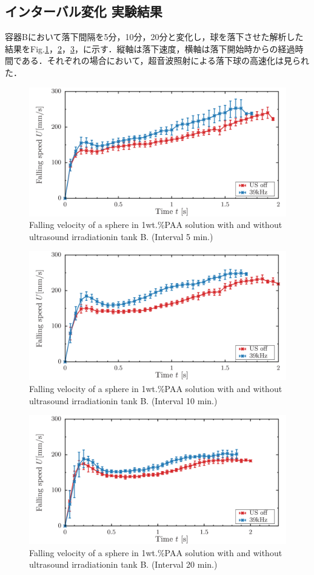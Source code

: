 \newpage

\subsection{インターバル変化 実験結果}

容器Bにおいて落下間隔を5分，10分，20分と変化し，球を落下させた解析した結果をFig.\ref{fig:falling-5}，\ref{fig:falling-10}，\ref{fig:falling-20}，に示す．縦軸は落下速度，横軸は落下開始時からの経過時間である．それぞれの場合において，超音波照射による落下球の高速化は見られた．

\begin{figure}[ht]
    \centering
    \includegraphics[width=12cm,clip]{./4-Results/s1-5.png}
    \caption{Falling velocity of a sphere in 1wt.\%PAA solution with and without ultrasound irradiationin tank B. (Interval 5 min.)}
    \label{fig:falling-5}
\end{figure}
\begin{figure}[ht]
    \centering
    \includegraphics[width=12cm,clip]{./4-Results/s1-10.png}
    \caption{Falling velocity of a sphere in 1wt.\%PAA solution with and without ultrasound irradiationin tank B. (Interval 10 min.)}
    \label{fig:falling-10}
\end{figure}
\begin{figure}[ht]
    \centering
    \includegraphics[width=12cm,clip]{./4-Results/s1-20.png}
    \caption{Falling velocity of a sphere in 1wt.\%PAA solution with and without ultrasound irradiationin tank B. (Interval 20 min.)}
    \label{fig:falling-20}
\end{figure}

\clearpage
